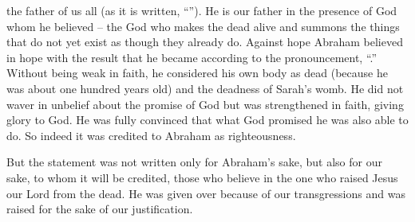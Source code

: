 {the father
of us
all
(as
it is written, “{}”). He is our father in the presence
of God whom
he believed
– the God
who makes
the dead
alive
and
summons
the things that do not
yet exist
as though
they already do.
Against hope
Abraham believed
in
hope
with the result that he
became
{}
according to
the pronouncement, “{}.”
Without
being weak
in faith,
he considered
his own
body
as dead
(because he was
about
one hundred years old) and
the deadness
of Sarah’s
womb.
He did
not
waver
in unbelief
about
the promise
of God
but
was strengthened
in faith,
giving
glory
to God.
He
was fully convinced
that
what
God promised
he was
also
able
to do.
So indeed
it was credited
to Abraham
as
righteousness.
\par }{\PP {}But
the statement
{}
was
not
written
only
for
Abraham’s
sake,
but
also
for
our
sake,
to whom
it will
be credited,
those who believe
in
the one who raised
Jesus
our
Lord
from
the dead.
He was given over
because
of our
transgressions
and
was raised
for the sake
of our
justification.

}
